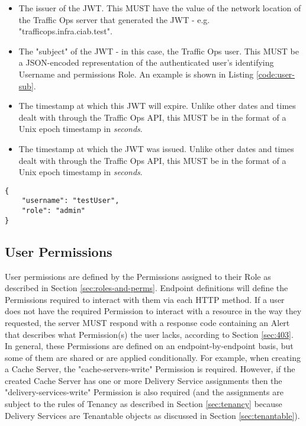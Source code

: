 \begin{itemize}
	\item {} The issuer of the JWT. This MUST have the value of the
	network location of the Traffic Ops server that generated the JWT - e.g.
	"trafficops.infra.ciab.test".
	\item {} The "subject" of the JWT - in this case, the Traffic Ops
	user. This MUST be a JSON-encoded representation of the authenticated user's
	identifying Username and permissions Role. An example is shown in Listing
	\ref{code:user-sub}.
	\item {} The timestamp at which this JWT will expire. Unlike other
	dates and times dealt with through the Traffic Ops API, this MUST be in the
	format of a Unix epoch timestamp in \emph{seconds}.
	\item {} The timestamp at which the JWT was issued. Unlike other
	dates and times dealt with through the Traffic Ops API, this MUST be in the
	format of a Unix epoch timestamp in \emph{seconds}.
\end{itemize}

\begin{codelisting}
\label{code:user-sub}
\begin{verbatim}
{
	"username": "testUser",
	"role": "admin"
}
\end{verbatim}
\end{codelisting}

\subsection{User Permissions}
User permissions are defined by the Permissions assigned to their Role as
described in Section \ref{sec:roles-and-perms}. Endpoint definitions will define
the Permissions required to interact with them via each HTTP method. If a user
does not have the required Permission to interact with a resource in the way
they requested, the server MUST respond with a  response
code containing an Alert that describes what Permission(s) the user lacks,
according to Section \ref{sec:403}. In general, these Permissions are defined on
an endpoint-by-endpoint basis, but some of them are shared or are applied
conditionally. For example, when creating a Cache Server, the
"cache-servers-write" Permission is required. However, if the created Cache
Server has one or more Delivery Service assignments then the
"delivery-services-write" Permission is also required (and the assignments are
subject to the rules of Tenancy as described in Section \ref{sec:tenancy}
because Delivery Services are Tenantable objects as discussed in Section
\ref{sec:tenantable}).
